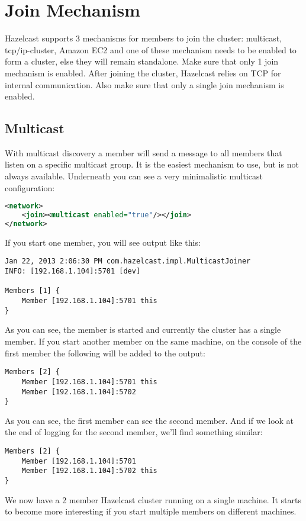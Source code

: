 \section{Join Mechanism }
Hazelcast supports 3 mechanisms for members to join the cluster: multicast, tcp/ip-cluster, Amazon EC2 and one of these mechanism needs to be enabled to form a cluster, else they will remain standalone. Make sure that only 1 join mechanism is enabled. After joining the cluster, Hazelcast relies on TCP for internal communication. Also make sure that only a single join mechanism is enabled.

\subsection{Multicast}
With multicast discovery a member will send a message to all members that listen on a specific multicast group. It is the easiest mechanism to use, but is not always available. Underneath you can see a very minimalistic multicast configuration:
\begin{lstlisting}[language=xml]
<network>
    <join><multicast enabled="true"/></join>
</network>
\end{lstlisting}
If you start one member, you will see output like this:
\begin{lstlisting}
Jan 22, 2013 2:06:30 PM com.hazelcast.impl.MulticastJoiner
INFO: [192.168.1.104]:5701 [dev] 

Members [1] {
	Member [192.168.1.104]:5701 this
}
\end{lstlisting}	
As you can see, the member is started and currently the cluster has a single member. If you start another member on the same machine, on the console of the first member the following will be added to the output:
\begin{lstlisting}
Members [2] {
	Member [192.168.1.104]:5701 this
	Member [192.168.1.104]:5702
}
\end{lstlisting}	
As you can see, the first member can see the second member. And if we look at the end of logging for the second member, we'll find something similar:
\begin{lstlisting}
Members [2] {
	Member [192.168.1.104]:5701
	Member [192.168.1.104]:5702 this
}
\end{lstlisting}		
We now have a 2 member Hazelcast cluster running on a single machine. It starts to become more interesting if you start multiple members on different machines.

